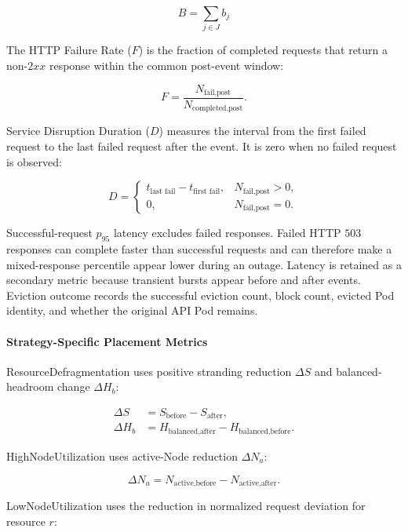 \[
B
=
\sum_{j \in J} b_j
\]

The HTTP Failure Rate (\(F\)) is the fraction of completed requests that return a non-\(2xx\) response within the common post-event window:

\[
F
=
\frac{N_{\text{fail,post}}}{N_{\text{completed,post}}}.
\]

Service Disruption Duration (\(D\)) measures the interval from the first failed request to the last failed request after the event. It is zero when no failed request is observed:

\[
D =
\begin{cases}
t_{\text{last fail}} - t_{\text{first fail}}, & N_{\text{fail,post}} > 0,\\
0, & N_{\text{fail,post}} = 0.
\end{cases}
\]

Successful-request \(p_{95}\) latency excludes failed responses. Failed HTTP \(503\) responses can complete faster than successful requests and can therefore make a mixed-response percentile appear lower during an outage. Latency is retained as a secondary metric because transient bursts appear before and after events. Eviction outcome records the successful eviction count, block count, evicted Pod identity, and whether the original API Pod remains.

\paragraph{Strategy-Specific Placement Metrics}
\label{subsubsec:actualusage4_metric_strandingdelta}
ResourceDefragmentation uses positive stranding reduction \(\Delta S\) and balanced-headroom change \(\Delta H_b\):

\[
\begin{aligned}
\Delta S
&=
S_{\text{before}} - S_{\text{after}},\\
\Delta H_b
&=
H_{\text{balanced,after}} - H_{\text{balanced,before}}.
\end{aligned}
\]

HighNodeUtilization uses active-Node reduction \(\Delta N_a\):

\[
\Delta N_a
=
N_{\text{active,before}} - N_{\text{active,after}}.
\]

LowNodeUtilization uses the reduction in normalized request deviation for resource \(r\):

